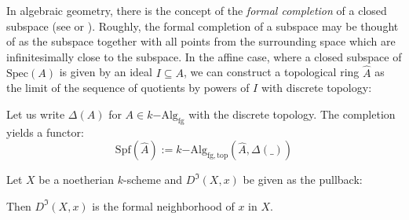 \documentclass[9pt,twosided]{amsart}
\newcommand{\Spec}{\ensuremath{\mathrm{Spec}}}
\newcommand{\Spf}{\ensuremath{\mathrm{Spf}}}
\newcommand{\fgkAlg}{\ensuremath{k\mathrm{-Alg}_{\mathrm{fg}}}}
\newcommand{\fgkAlgTop}{\ensuremath{k\mathrm{-Alg}_{\mathrm{fg,top}}}}
\begin{document}
In algebraic geometry, there is the concept of the \emph{formal completion} of a closed subspace (see \cite[p.194]{hartshorne} or \cite[10.8]{ega}).
Roughly, the formal completion of a subspace may be thought of as the subspace together with
all points from the surrounding space which are infinitesimally close to the subspace.
In the affine case, where a closed subspace of $\Spec(A)$ is given by an ideal $I\subseteq A$, we can construct a topological ring $\hat{A}$
as the limit of the sequence of quotients by powers of $I$ with discrete topology:
\begin{center}
\end{center}
Let us write $\Delta(A)$ for $A\in\fgkAlg$ with the discrete topology.
The completion yields a functor:
\[ \Spf(\hat{A}) := \fgkAlgTop(\hat{A},\Delta(\_))\]
\begin{rmk}
  Let $X$ be a noetherian $k$-scheme and $D^\Im(X,x)$ be given as the pullback:
  \begin{center}
  \end{center}
  Then $D^\Im(X,x)$ is the formal neighborhood of $x$ in $X$. 
\end{rmk}
\end{document}
